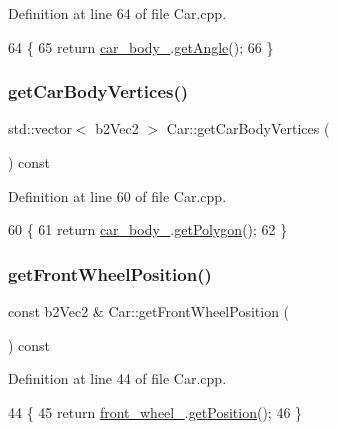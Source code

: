 Definition at line 64 of file Car.\+cpp.


\begin{DoxyCode}
64                                  \{
65     \textcolor{keywordflow}{return} \hyperlink{classCar_a6a0d40752a134fb4f0693a28a4e64a0d}{car\_body\_}.\hyperlink{classCarBody_a92d8865abe51f98b4fa7b4314e7372d8}{getAngle}();
66 \}
\end{DoxyCode}
\mbox{\label{classCar_a54179bc7ddca42a4f285c0475174f5b5}} 
\subsubsection{\texorpdfstring{get\+Car\+Body\+Vertices()}{getCarBodyVertices()}}
{\footnotesize\ttfamily std\+::vector$<$ b2\+Vec2 $>$ Car\+::get\+Car\+Body\+Vertices (\begin{DoxyParamCaption}{ }\end{DoxyParamCaption}) const}



Definition at line 60 of file Car.\+cpp.


\begin{DoxyCode}
60                                                 \{
61     \textcolor{keywordflow}{return} \hyperlink{classCar_a6a0d40752a134fb4f0693a28a4e64a0d}{car\_body\_}.\hyperlink{classCarBody_ad446bb563f4475c59d28054bbe886a9d}{getPolygon}();
62 \}
\end{DoxyCode}
\mbox{\label{classCar_a0e86ef897f09538a3815965b99d97f48}} 
\subsubsection{\texorpdfstring{get\+Front\+Wheel\+Position()}{getFrontWheelPosition()}}
{\footnotesize\ttfamily const b2\+Vec2 \& Car\+::get\+Front\+Wheel\+Position (\begin{DoxyParamCaption}{ }\end{DoxyParamCaption}) const}



Definition at line 44 of file Car.\+cpp.


\begin{DoxyCode}
44                                                \{
45     \textcolor{keywordflow}{return} \hyperlink{classCar_a9c6abcefc82b364b09e67fad1b200beb}{front\_wheel\_}.\hyperlink{classWheel_a645ce5d8595047c6774f936794e3f543}{getPosition}();
46 \}
\end{DoxyCode}
\mbox{\label{classCar_a00f0b724a34f1f98411e098492823bf1}} 
